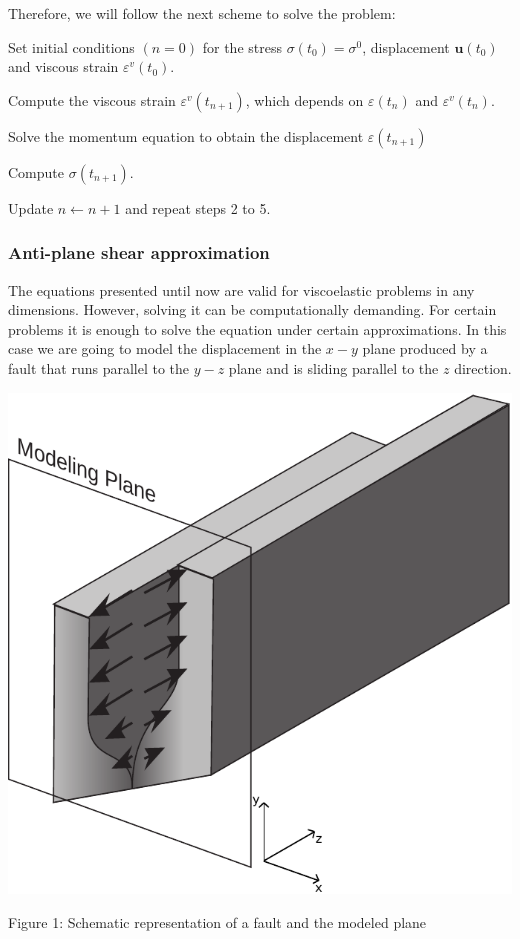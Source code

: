 Therefore, we will follow the next scheme to solve the problem\-:
\begin{DoxyEnumerate}
\item Set initial conditions $ (n = 0) $ for the stress $\sigma(t_0) = \sigma^0$, displacement $ \boldsymbol{u}(t_0) $ and viscous strain $ \varepsilon^v(t_0) $.
\item Compute the viscous strain $ \varepsilon^v(t_{n+1}) $, which depends on $ \varepsilon(t_n) $ and $ \varepsilon^v(t_n) $.
\item Solve the momentum equation to obtain the displacement $ \varepsilon (t_{n+1}) $
\item Compute $ \sigma (t_{n+1}) $.
\item Update $ n \leftarrow n+1 $ and repeat steps 2 to 5.
\end{DoxyEnumerate}\hypertarget{index_anti_plane}{}\subsubsection{Anti-\/plane shear approximation}\label{index_anti_plane}
The equations presented until now are valid for viscoelastic problems in any dimensions. However, solving it can be computationally demanding. For certain problems it is enough to solve the equation under certain approximations. In this case we are going to model the displacement in the $x-y$ plane produced by a fault that runs parallel to the $y-z$ plane and is sliding parallel to the $z$ direction. 
\begin{DoxyImage}
\includegraphics{aps}
\caption{Figure 1\-: Schematic representation of a fault and the modeled plane}
\end{DoxyImage}
